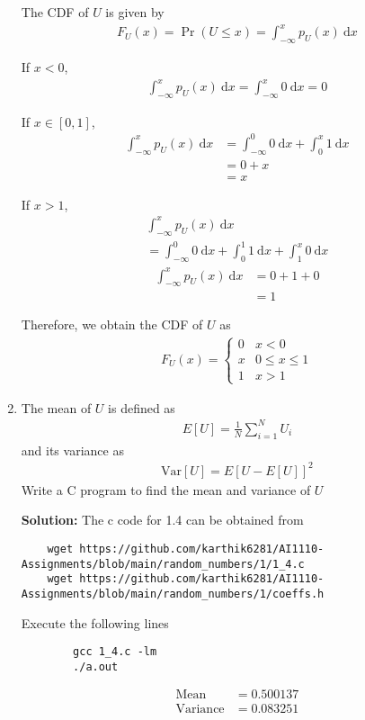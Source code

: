 \documentclass[journal,12pt,twocolumn]{IEEEtran}
\newcommand{\solution}{\noindent \textbf{Solution: }}
\providecommand{\pr}[1]{\ensuremath{\Pr\left(#1\right)}}
\providecommand{\mean}[1]{E\left[ #1 \right]}
\providecommand{\var}[1]{\mathrm{Var}\left[ #1 \right]}
\numberwithin{equation}{section}
\renewcommand\thesection{\arabic{section}}
\begin{document}
\begin{enumerate}[label=\thesection.\arabic*,ref=\thesection.\theenumi]
	The CDF of $U$ is given by
	\begin{align}
		F_{U}(x) = \pr{U \le x} = \int_{-\infty}^x p_{U}(x) ~\mathrm{d}x
	\end{align}
	
	If $x<0$,
	\begin{align}
		\int_{-\infty}^x p_{U}(x) ~\mathrm{d}x = \int_{-\infty}^x 0 ~\mathrm{d}x = 0
	\end{align}
	
	If $x \in [0, 1]$,
	\begin{align}
		\int_{-\infty}^x p_{U}(x) ~\mathrm{d}x &= \int_{-\infty}^0 0 ~\mathrm{d}x + \int_0^x 1 ~\mathrm{d}x \\
		&= 0 + x \\
		&= x
	\end{align}
	
	If $x>1$,
	\begin{multline}
		\int_{-\infty}^x p_{U}(x) ~\mathrm{d}x \\= \int_{-\infty}^0 0 ~\mathrm{d}x + \int_0^1 1 ~\mathrm{d}x +  \int_1^x 0 ~\mathrm{d}x 
	\end{multline}
	\begin{align}
		\int_{-\infty}^x p_{U}(x) ~\mathrm{d}x &= 0 + 1 + 0 \\
		&= 1
	\end{align}
	
	Therefore, we obtain the CDF of $U$ as
	\begin{align}
		F_{U}(x) = 
		\begin{cases}
			0 & x < 0 \\
			x & 0 \le x \le 1 \\
			1 & x > 1
		\end{cases}
	\end{align}
	
	\item The mean of $U$ is defined as
	\begin{align}
		\mean{U} = \frac{1}{N}\sum_{i=1}^{N}U_i
	\end{align}
	and its variance as
	\begin{align}
		\var{U} = \mean{U- \mean{U}}^2 
	\end{align}
	Write a C program to  find the mean and variance of $U$
	
	\solution The c code for 1.4 can be obtained from
	\begin{lstlisting}
	wget https://github.com/karthik6281/AI1110-Assignments/blob/main/random_numbers/1/1_4.c
	wget https://github.com/karthik6281/AI1110-Assignments/blob/main/random_numbers/1/coeffs.h
	\end{lstlisting}
	Execute the following lines
	\begin{lstlisting}
		gcc 1_4.c -lm
		./a.out
	\end{lstlisting}
	\begin{align}
		\text{Mean} &= 0.500137 \\
		\text{Variance} &= 0.083251
	\end{align}
	

\end{enumerate}
\end{document}
